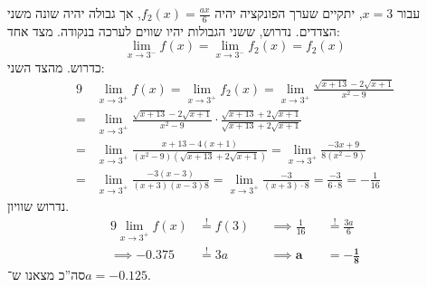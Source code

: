 \documentclass[]{article}
\newcommand\seq   {\overset{!}{=}}
\begin{document}
	עבור $x = 3 $, יתקיים שערך הפונקציה יהיה $f_2(x) = \frac{ax}{6}$, אך גבולה יהיה שונה משני הצדדים. נדרוש, ששני הגבולות יהיו שווים לערכה בנקודה. מצד אחד: 
	\[ \lim_{x \to 3^-} f(x) = \lim_{x \to 3^-} f_2(x) = f_2(x) \]
	כדרוש. מהצד השני: 
	\begin{alignat*}{9}
		 & \lim_{x \to 3^+} f(x) = \lim_{x \to 3^+} f_2(x) = \lim_{x \to 3^+} \frac{\sqrt{x + 13} - 2\sqrt{x + 1}}{x^2 - 9} \\
		=& \lim_{x \to 3^+} \frac{\sqrt{x + 13} - 2\sqrt{x + 1}}{x^2 - 9} \cdot \frac{\sqrt{x + 13} + 2\sqrt{x + 1}}{\sqrt{x + 13} + 2\sqrt{x + 1}} \\
		=& \lim_{x \to 3^+} \frac{x + 13 - 4(x + 1)}{(x^2 - 9)(\sqrt{x + 13} + 2\sqrt{x + 1})} = \lim_{x \to 3^+} \frac{-3x + 9}{8(x^2 - 9)} \\
		=& \lim_{x \to 3^+} \frac{-3(x - 3)}{(x + 3)(x - 3)8} = \lim_{x \to 3^+} \frac{-3}{(x + 3) \cdot 8} = \frac{-3}{6 \cdot 8} = -\frac{1}{16}
	\end{alignat*}
	נדרוש שוויון. 
	\begin{alignat*}{9}
		\lim_{x \to 3^+} f(x) &\seq f(3)
		&&\implies \frac{1}{16} &&\seq \frac{3a}{6} \\
		\implies -0.375 &\seq 3a &&\implies \bm{a} &&\bm{=} \bm{-\frac{1}{8}}
	\end{alignat*}
	סה''כ מצאנו ש־$a = -0.125 $. 
\end{document}
